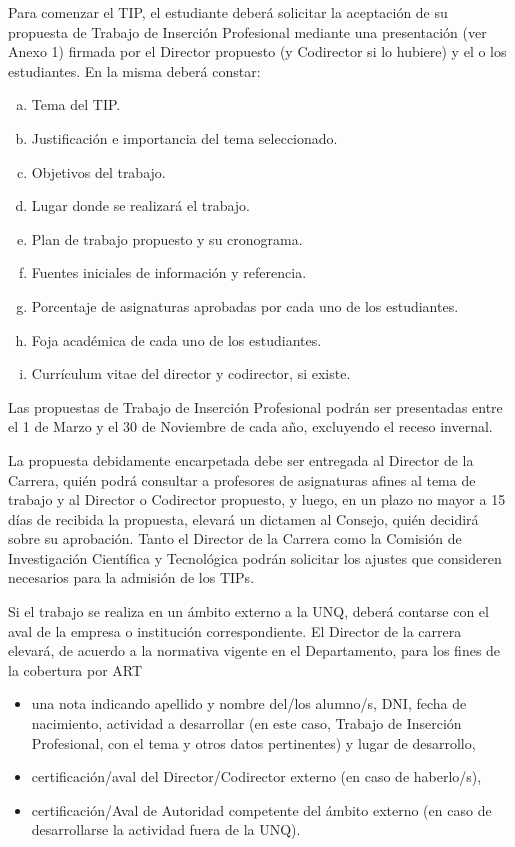 
\articulo Para comenzar el TIP, el estudiante deberá solicitar la aceptación
de su propuesta de Trabajo de Inserción Profesional mediante una presentación (ver
Anexo 1) firmada por el Director propuesto (y Codirector si lo hubiere) y el o los
estudiantes. En la misma deberá constar:

\begin{enumerate}[a.]
\item Tema del TIP.
\item Justificación e importancia del tema seleccionado.
\item Objetivos del trabajo.
\item Lugar donde se realizará el trabajo.
\item Plan de trabajo propuesto y su cronograma.
\item Fuentes iniciales de información y referencia.
\item Porcentaje de asignaturas aprobadas por cada uno de los estudiantes.
\item Foja académica de cada uno de los estudiantes.
\item Currículum vitae del director y codirector, si existe.
\end{enumerate}

\articulo Las propuestas de Trabajo de Inserción Profesional podrán ser
presentadas entre el 1 de Marzo y el 30 de Noviembre de cada año, excluyendo el
receso invernal.

\articulo La propuesta debidamente encarpetada debe ser entregada al
Director de la Carrera, quién podrá consultar a profesores de asignaturas afines al
tema de trabajo y al Director o Codirector propuesto, y luego, en un plazo no mayor a
15 días de recibida la propuesta, elevará un dictamen al Consejo, quién decidirá sobre
su aprobación. Tanto el Director de la Carrera como la Comisión de Investigación
Científica y Tecnológica podrán solicitar los ajustes que consideren necesarios para la
admisión de los TIPs. 

\articulo Si el trabajo se realiza en un ámbito externo a la UNQ, deberá
contarse con el aval de la empresa o institución correspondiente. El Director de la
carrera elevará, de acuerdo a la normativa vigente en el Departamento, para los fines
de la cobertura por ART

\begin{itemize}
 \item una nota indicando apellido y nombre del/los alumno/s, DNI, fecha
 de nacimiento, actividad a desarrollar (en este caso, Trabajo de
 Inserción Profesional, con el tema y otros datos pertinentes) y lugar
 de desarrollo,
 \item certificación/aval del Director/Codirector externo (en caso de
 haberlo/s),
 \item certificación/Aval de Autoridad competente del ámbito externo (en
 caso de desarrollarse la actividad fuera de la UNQ).
\end{itemize}


